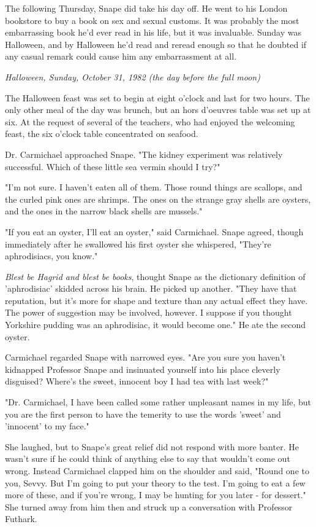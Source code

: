 \documentclass[a4paper,11pt]{article}
\begin{document}
The following Thursday, Snape did take his day off. He went to his London bookstore to buy a book on sex and sexual customs. It was probably the most embarrassing book he'd ever read in his life, but it was invaluable. Sunday was Halloween, and by Halloween he'd read and reread enough so that he doubted if any casual remark could cause him any embarrassment at all.

\emph{Halloween, Sunday, October 31, 1982 (the day before the full moon)}

The Halloween feast was set to begin at eight o'clock and last for two hours. The only other meal of the day was brunch, but an hors d'oeuvres table was set up at six. At the request of several of the teachers, who had enjoyed the welcoming feast, the six o'clock table concentrated on seafood.

Dr. Carmichael approached Snape. "The kidney experiment was relatively successful. Which of these little sea vermin should I try?"

"I'm not sure. I haven't eaten all of them. Those round things are scallops, and the curled pink ones are shrimps. The ones on the strange gray shells are oysters, and the ones in the narrow black shells are mussels."

"If you eat an oyster, I'll eat an oyster," said Carmichael. Snape agreed, though immediately after he swallowed his first oyster she whispered, "They're aphrodisiacs, you know."

\emph{Blest be Hagrid and blest be books}, thought Snape as the dictionary definition of 'aphrodisiac' skidded across his brain. He picked up another. "They have that reputation, but it's more for shape and texture than any actual effect they have. The power of suggestion may be involved, however. I suppose if you thought Yorkshire pudding was an aphrodisiac, it would become one." He ate the second oyster.

Carmichael regarded Snape with narrowed eyes. "Are you sure you haven't kidnapped Professor Snape and insinuated yourself into his place cleverly disguised? Where's the sweet, innocent boy I had tea with last week?"

"Dr. Carmichael, I have been called some rather unpleasant names in my life, but you are the first person to have the temerity to use the words 'sweet' and 'innocent' to my face."

She laughed, but to Snape's great relief did not respond with more banter. He wasn't sure if he could think of anything else to say that wouldn't come out wrong. Instead Carmichael clapped him on the shoulder and said, "Round one to you, Sevvy. But I'm going to put your theory to the test. I'm going to eat a few more of these, and if you're wrong, I may be hunting for you later - for dessert." She turned away from him then and struck up a conversation with Professor Futhark.
\end{document}

